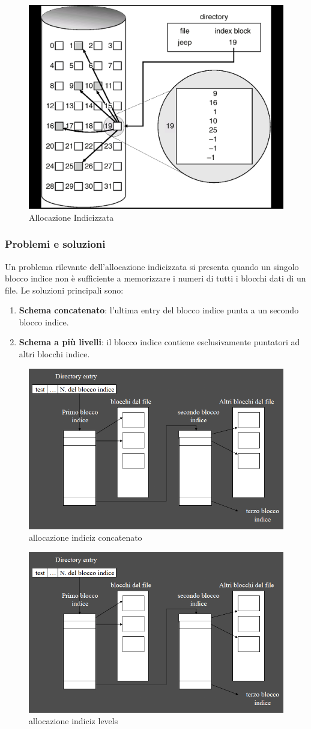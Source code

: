 \begin{figure}[h] \centering \includegraphics[width=0.50\linewidth]{images/allocazione_indiciz.png} \caption{Allocazione Indicizzata} \label{fig:14.4} \end{figure}

\subsubsection{Problemi e soluzioni}
Un problema rilevante dell’allocazione indicizzata si presenta quando un singolo blocco indice non è sufficiente a memorizzare i numeri di tutti i blocchi dati di un file.  
Le soluzioni principali sono:
\begin{enumerate}
    \item \textbf{Schema concatenato}: l’ultima entry del blocco indice punta a un secondo blocco indice.
    \item \textbf{Schema a più livelli}: il blocco indice contiene esclusivamente puntatori ad altri blocchi indice.
\end{enumerate}

\begin{figure}[h] \centering \includegraphics[width=0.50\linewidth]{images/allocazione_indiciz_concatenato.png} \caption{allocazione indiciz concatenato} \label{fig:14.4a} \end{figure}
\begin{figure}[h] \centering \includegraphics[width=0.50\linewidth]{images/allocazione_indiciz_levels.png} \caption{allocazione indiciz levels} \label{fig:14.4b} \end{figure}
